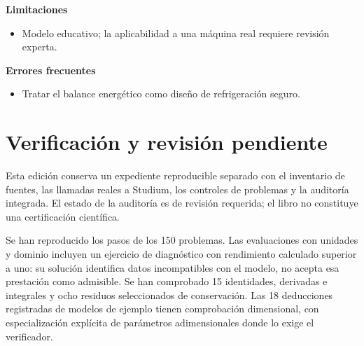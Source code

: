 \documentclass[10pt,openany]{book}
\begin{document}
\noindent\textbf{Limitaciones}
\begin{itemize}
\item Modelo educativo; la aplicabilidad a una máquina real requiere revisión experta.
\end{itemize}

\noindent\textbf{Errores frecuentes}
\begin{itemize}
\item Tratar el balance energético como diseño de refrigeración seguro.
\end{itemize}
\begin{center}\end{center}
\chapter{Verificación y revisión pendiente}
Esta edición conserva un expediente reproducible separado con el inventario de fuentes, las llamadas reales a Studium, los controles de problemas y la auditoría integrada. El estado de la auditoría es de revisión requerida; el libro no constituye una certificación científica.

Se han reproducido los pasos de los 150 problemas. Las evaluaciones con unidades y dominio incluyen un ejercicio de diagnóstico con rendimiento calculado superior a uno: su solución identifica datos incompatibles con el modelo, no acepta esa prestación como admisible. Se han comprobado 15 identidades, derivadas e integrales y ocho residuos seleccionados de conservación. Las 18 deducciones registradas de modelos de ejemplo tienen comprobación dimensional, con especialización explícita de parámetros adimensionales donde lo exige el verificador.
\end{document}
